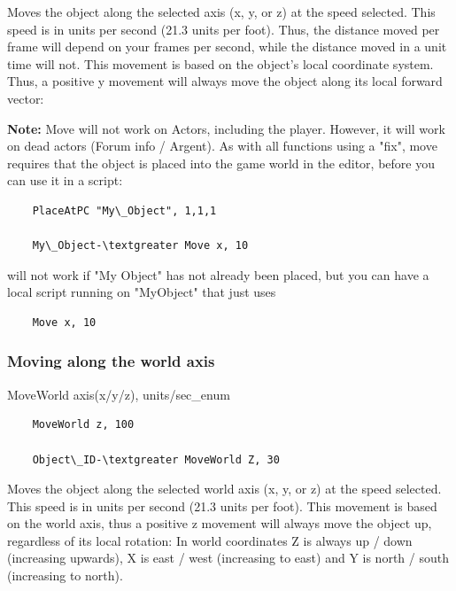 Moves the object along the selected axis (x, y, or z) at the speed
selected. This speed is in units per second (21.3 units per foot). Thus,
the distance moved per frame will depend on your frames per second,
while the distance moved in a unit time will not. This movement is based
on the object's local coordinate system. Thus, a positive y movement
will always move the object along its local forward vector:


\textbf{Note:} Move will not work on Actors, including the player.
However, it will work on dead actors (Forum info / Argent). As with all
functions using a "fix", move requires that the object is placed into
the game world in the editor, before you can use it in a script:

\begin{lstlisting}
	PlaceAtPC "My\_Object", 1,1,1
	
	My\_Object-\textgreater Move x, 10
\end{lstlisting}

will not work if "My Object" has not already been placed, but you can
have a local script running on "MyObject" that just uses

\begin{lstlisting}
	Move x, 10
\end{lstlisting}

\hypertarget{moving-along-the-world-axis}{%
\subsubsection{Moving along the world
axis}\label{moving-along-the-world-axis}}

	MoveWorld axis(x/y/z), units/sec\_enum

\begin{lstlisting}	
	MoveWorld z, 100
	
	Object\_ID-\textgreater MoveWorld Z, 30
\end{lstlisting}

Moves the object along the selected world axis (x, y, or z) at the speed
selected. This speed is in units per second (21.3 units per foot). This
movement is based on the world axis, thus a positive z movement will
always move the object up, regardless of its local rotation: In world
coordinates Z is always up / down (increasing upwards), X is east / west
(increasing to east) and Y is north / south (increasing to north).


